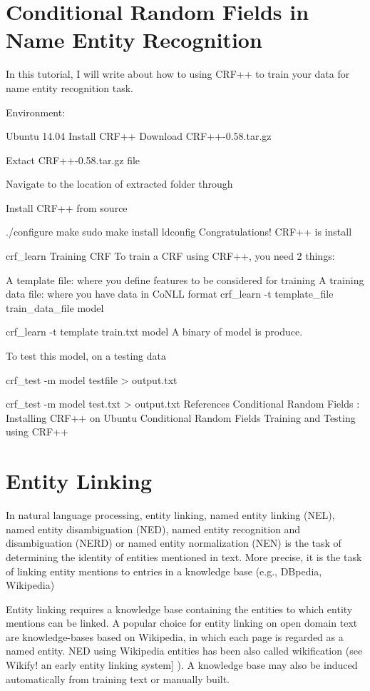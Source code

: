 \section{Conditional Random Fields in Name Entity Recognition}

In this tutorial, I will write about how to using CRF++ to train your data for name entity recognition task.

Environment:

Ubuntu 14.04
Install CRF++
Download CRF++-0.58.tar.gz

Extact CRF++-0.58.tar.gz file

Navigate to the location of extracted folder through

Install CRF++ from source

./configure
make
sudo make install
ldconfig
Congratulations! CRF++ is install

crf_learn
Training CRF
To train a CRF using CRF++, you need 2 things:

A template file: where you define features to be considered for training
A training data file: where you have data in CoNLL format
crf_learn -t template_file train_data_file model

crf_learn -t template train.txt model
A binary of model is produce.

To test this model, on a testing data

crf_test -m model testfile > output.txt

crf_test -m model test.txt > output.txt
References
Conditional Random Fields : Installing CRF++ on Ubuntu
Conditional Random Fields Training and Testing using CRF++

\section{Entity Linking}

In natural language processing, entity linking, named entity linking (NEL), named entity disambiguation (NED), named entity recognition and disambiguation (NERD) or named entity normalization (NEN) is the task of determining the identity of entities mentioned in text. More precise, it is the task of linking entity mentions to entries in a knowledge base (e.g., DBpedia, Wikipedia)

Entity linking requires a knowledge base containing the entities to which entity mentions can be linked. A popular choice for entity linking on open domain text are knowledge-bases based on Wikipedia, in which each page is regarded as a named entity. NED using Wikipedia entities has been also called wikification (see Wikify! an early entity linking system] ). A knowledge base may also be induced automatically from training text or manually built.

